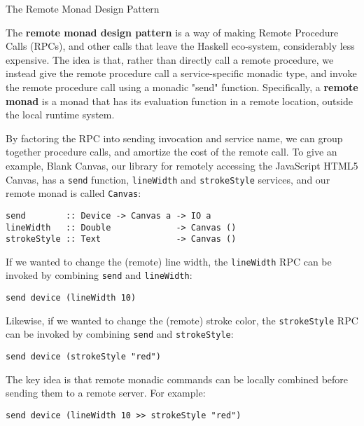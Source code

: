\begin{hcarentry}[new]{The Remote Monad Design Pattern}
\label{Wakarusa}
\makeheader

The {\bf remote monad design pattern} is a way of
making Remote Procedure Calls (RPCs), and other
calls that leave the Haskell eco-system, considerably less expensive.
The idea is that, rather than directly call a remote procedure,
we instead give the remote procedure call a service-specific monadic
type, and invoke the remote procedure call using a monadic "send" function.
Specifically, a {\bf remote monad} is a monad that has its evaluation function in
a remote location, outside the local runtime system.

By factoring the RPC into sending invocation and service name, we can
group together procedure calls, and amortize the cost of the remote
call. To give an example, Blank Canvas, our library for remotely
accessing the JavaScript HTML5 Canvas, has a \verb|send| function,
\verb`lineWidth` and \verb`strokeStyle` services, and our remote monad is called
\verb`Canvas`:

\begin{verbatim}
send        :: Device -> Canvas a -> IO a
lineWidth   :: Double             -> Canvas ()
strokeStyle :: Text               -> Canvas ()
\end{verbatim}

If we wanted to change the (remote) line width,
the \verb`lineWidth` RPC can be invoked by combining \verb`send`
and \verb`lineWidth`:

\begin{verbatim}
send device (lineWidth 10)
\end{verbatim}

Likewise, if we wanted to change the (remote) stroke color,
the \verb`strokeStyle` RPC can be invoked by combining \verb`send`
and \verb`strokeStyle`:

\begin{verbatim}
send device (strokeStyle "red")
\end{verbatim}

The key idea is that remote monadic commands can
be locally combined before sending them to a remote server.
For example:

\begin{verbatim}
send device (lineWidth 10 >> strokeStyle "red")
\end{verbatim}


\end{hcarentry}

